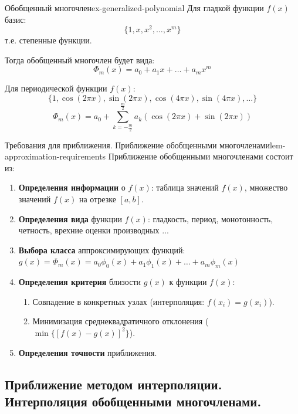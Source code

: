 \documentclass[14pt]{extarticle}
\begin{document}
    \clearpage
    \begin{example}{Обобщенный многочлен}{ex-generalized-polynomial}
        Для гладкой функции $f(x)$ базис:
        $$\{1, x, x^{2}, \ldots, x^{m}\}$$
        т.е. степенные функции.

        Тогда обобщенный многочлен будет вида:
        $$\Phi_{m}(x) = a_{0} + a_{1}x + \ldots + a_{m}x^{m}$$

        \vspace{\baselineskip}

        Для периодической функции $f(x)$:
        $$\{1, \cos(2\pi x), \sin(2\pi x), \cos(4\pi x), \sin(4\pi x), \ldots\}$$
        $$\Phi_{m}(x) = a_{0} + \sum_{k=-\frac{m}{2}}^{\frac{m}{2}} a_{k}(\cos(2\pi x) + \sin(2\pi x))$$
    \end{example}

    \begin{lemma}{Требования для приближения. Приближение обобщенными многочленами}{lem-approximation-requirements}
        Приближение обобщенными многочленами состоит из:
        \begin{enumerate}
            \item \textbf{Определения информации} о $f(x)$: таблица значений $f(x)$, множество значений $f(x)$ на отрезке $[a, b]$.
            \item \textbf{Определения вида} функции $f(x)$: гладкость, период, монотонность, четность, врехние оценки производных ...
            \item \textbf{Выбора класса} аппроксимирующих функций: $g(x) = \Phi_{m}(x) = a_{0}\phi_{0}(x) + a_{1}\phi_{1}(x) + \ldots + a_{m}\phi_{m}(x)$ 
            \item \textbf{Определения критерия} близости $g(x)$ к функции $f(x)$:
                  \begin{enumerate}
                      \item Совпадение в конкретных узлах (интерполяция: $f(x_{i}) = g(x_{i})$).
                      \item Минимизация среднеквадратичного отклонения ($\min\{[f(x) - g(x)]^{2}\}$).
                  \end{enumerate}
            \item \textbf{Определения точности} приближения.
        \end{enumerate}
    \end{lemma}

\clearpage
\subsection{Приближение методом интерполяции. Интерполяция обобщенными многочленами.}
\end{document}
